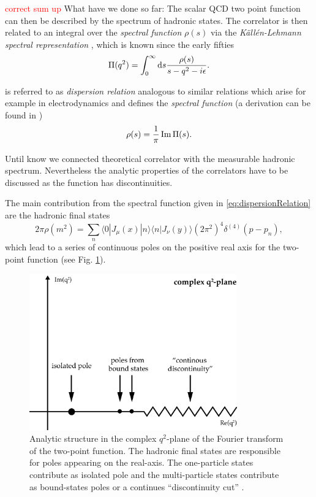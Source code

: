 \documentclass[../../index.tex]{subfiles}
\begin{document}
\textcolor{red}{correct sum up} What have we done so far: The scalar QCD two
point function can then be described by the spectrum of hadronic states. The
correlator is then related to an integral over the \textit{spectral function}
$\rho(s)$ via the \textit{Källén-Lehmann spectral representation}
\cite{Kallen1952,Lehmann1954}, which is known since the early fifties
\begin{equation}
  \label{eq:dispersionRelation}
  \Pi(q^2) = \int_0^\infty \dif s \frac{\rho(s)}{s - q^2 - i \epsilon}.
\end{equation}

 is referred to as \textit{dispersion relation}
analogous to similar relations which arise for example in electrodynamics and
defines the \textit{spectral function} (a derivation can be found in
\cite{Rafael1997})
\begin{equation}
  \label{eq:spectralFunction}
  \rho(s) = \frac{1}{\pi} \operatorname{Im} \Pi(s).
\end{equation}

Until know we connected theoretical correlator with the measurable hadronic
spectrum. Nevertheless the analytic properties of the correlators have to be
discussed as the function has discontinuities.

The main contribution from the spectral function given in
\cref{eq:dispersionRelation} are the hadronic final states
\begin{equation}
  2 \pi \rho(m^2) = \sum_n \langle  0 | J_\mu(x) | n \rangle \langle n | J_\nu(y) \rangle (2 \pi^2)^4 \delta^{(4)}(p - p_n),
\end{equation}
which lead to a series of continuous poles on the positive real axis for the
two-point function (see Fig. \cref{fig:analyticStructureCorrelator}).
\begin{figure}
  \centering
  \includegraphics[width=0.8\textwidth]{./images/analyticStructureCorrelator.eps}
  \caption{Analytic structure in the complex $q^2$-plane of the Fourier
    transform of the two-point function. The hadronic final states are
    responsible for poles appearing on the real-axis. The one-particle states
    contribute as isolated pole and the multi-particle states contribute as
    bound-states poles or a continues ``discontinuity cut'' \cite{Peskin1995}.}
  \label{fig:analyticStructureCorrelator}
\end{figure}
\end{document}
